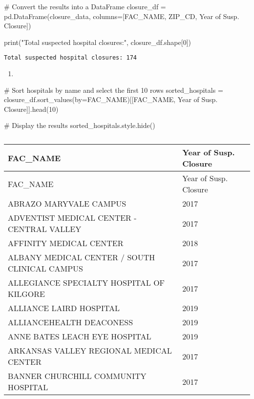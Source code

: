 \documentclass[
  letterpaper,
  DIV=11,
  numbers=noendperiod]{scrartcl}
\newenvironment{Shaded}{\begin{snugshade}}{\end{snugshade}}
\newcommand{\BuiltInTok}[1]{\textcolor[rgb]{0.00,0.23,0.31}{#1}}
\newcommand{\CommentTok}[1]{\textcolor[rgb]{0.37,0.37,0.37}{#1}}
\newcommand{\DecValTok}[1]{\textcolor[rgb]{0.68,0.00,0.00}{#1}}
\newcommand{\NormalTok}[1]{\textcolor[rgb]{0.00,0.23,0.31}{#1}}
\newcommand{\OperatorTok}[1]{\textcolor[rgb]{0.37,0.37,0.37}{#1}}
\newcommand{\StringTok}[1]{\textcolor[rgb]{0.13,0.47,0.30}{#1}}
\providecommand{\tightlist}{%
  \setlength{\itemsep}{0pt}\setlength{\parskip}{0pt}}\usepackage{longtable,booktabs,array}
\begin{document}
\begin{Shaded}
\begin{Highlighting}[]
\CommentTok{\# Convert the results into a DataFrame}
\NormalTok{closure\_df }\OperatorTok{=}\NormalTok{ pd.DataFrame(closure\_data, columns}\OperatorTok{=}\NormalTok{[}\StringTok{\textquotesingle{}FAC\_NAME\textquotesingle{}}\NormalTok{, }\StringTok{\textquotesingle{}ZIP\_CD\textquotesingle{}}\NormalTok{, }\StringTok{\textquotesingle{}Year of Susp. Closure\textquotesingle{}}\NormalTok{])}

\BuiltInTok{print}\NormalTok{(}\StringTok{"Total suspected hospital closures:"}\NormalTok{, closure\_df.shape[}\DecValTok{0}\NormalTok{])}
\end{Highlighting}
\end{Shaded}

\begin{verbatim}
Total suspected hospital closures: 174
\end{verbatim}

\begin{enumerate}
\def\labelenumi{\arabic{enumi}.}
\setcounter{enumi}{1}
\tightlist
\item
\end{enumerate}

\begin{Shaded}
\begin{Highlighting}[]
\CommentTok{\# Sort hospitals by name and select the first 10 rows}
\NormalTok{sorted\_hospitals }\OperatorTok{=}\NormalTok{ closure\_df.sort\_values(by}\OperatorTok{=}\StringTok{\textquotesingle{}FAC\_NAME\textquotesingle{}}\NormalTok{)[[}\StringTok{\textquotesingle{}FAC\_NAME\textquotesingle{}}\NormalTok{, }\StringTok{\textquotesingle{}Year of Susp. Closure\textquotesingle{}}\NormalTok{]].head(}\DecValTok{10}\NormalTok{)}

\CommentTok{\# Display the results}
\NormalTok{sorted\_hospitals.style.hide()}
\end{Highlighting}
\end{Shaded}

\begin{longtable}[]{@{}ll@{}}
\caption{}\label{T_3f5ca}\tabularnewline
\toprule\noalign{}
FAC\_NAME & Year of Susp. Closure \\
\midrule\noalign{}
\endfirsthead
\toprule\noalign{}
FAC\_NAME & Year of Susp. Closure \\
\midrule\noalign{}
\endhead
\bottomrule\noalign{}
\endlastfoot
ABRAZO MARYVALE CAMPUS & 2017 \\
ADVENTIST MEDICAL CENTER - CENTRAL VALLEY & 2017 \\
AFFINITY MEDICAL CENTER & 2018 \\
ALBANY MEDICAL CENTER / SOUTH CLINICAL CAMPUS & 2017 \\
ALLEGIANCE SPECIALTY HOSPITAL OF KILGORE & 2017 \\
ALLIANCE LAIRD HOSPITAL & 2019 \\
ALLIANCEHEALTH DEACONESS & 2019 \\
ANNE BATES LEACH EYE HOSPITAL & 2019 \\
ARKANSAS VALLEY REGIONAL MEDICAL CENTER & 2017 \\
BANNER CHURCHILL COMMUNITY HOSPITAL & 2017 \\
\end{longtable}
\end{document}
